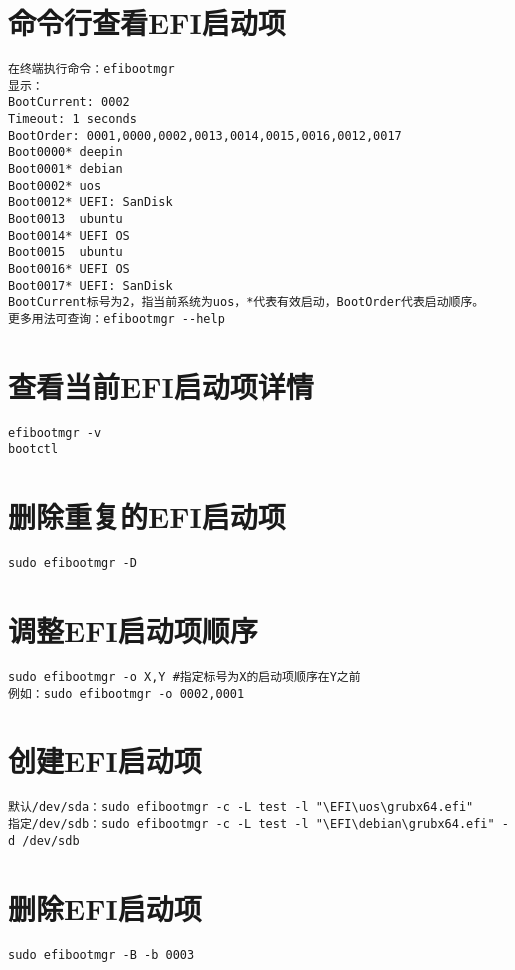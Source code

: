 \documentclass[a4paper,fontset=fandol,zihao=-4,linespread=1.2,oneside]{ctexbook}
\begin{document}
\section{命令行查看EFI启动项}
\begin{lstlisting}
在终端执行命令：efibootmgr
显示：
BootCurrent: 0002
Timeout: 1 seconds
BootOrder: 0001,0000,0002,0013,0014,0015,0016,0012,0017
Boot0000* deepin
Boot0001* debian
Boot0002* uos
Boot0012* UEFI: SanDisk
Boot0013  ubuntu
Boot0014* UEFI OS
Boot0015  ubuntu
Boot0016* UEFI OS
Boot0017* UEFI: SanDisk
BootCurrent标号为2，指当前系统为uos，*代表有效启动，BootOrder代表启动顺序。
更多用法可查询：efibootmgr --help
\end{lstlisting}

\section{查看当前EFI启动项详情}
\begin{lstlisting}
efibootmgr -v
bootctl
\end{lstlisting}

\section{删除重复的EFI启动项}
\begin{lstlisting}
sudo efibootmgr -D
\end{lstlisting}

\section{调整EFI启动项顺序}
\begin{lstlisting}
sudo efibootmgr -o X,Y #指定标号为X的启动项顺序在Y之前
例如：sudo efibootmgr -o 0002,0001
\end{lstlisting}

\section{创建EFI启动项}
\begin{lstlisting}
默认/dev/sda：sudo efibootmgr -c -L test -l "\EFI\uos\grubx64.efi"
指定/dev/sdb：sudo efibootmgr -c -L test -l "\EFI\debian\grubx64.efi" -d /dev/sdb
\end{lstlisting}

\section{删除EFI启动项}
\begin{lstlisting}
sudo efibootmgr -B -b 0003
\end{lstlisting}
\end{document}
